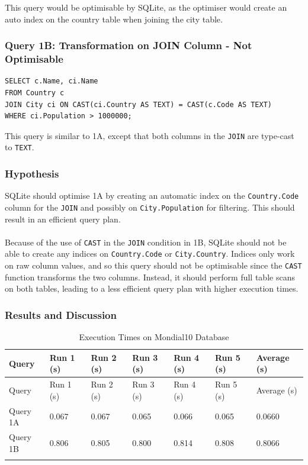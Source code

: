 \documentclass[11pt]{article}
\begin{document}
\noindent This query would be optimisable by SQLite, as the optimiser would create an auto index on the country table when joining the city table.

\subsubsection{Query 1B: Transformation on JOIN Column - Not Optimisable}

\begin{verbatim}
SELECT c.Name, ci.Name
FROM Country c
JOIN City ci ON CAST(ci.Country AS TEXT) = CAST(c.Code AS TEXT)
WHERE ci.Population > 1000000;
\end{verbatim}

\noindent This query is similar to 1A, except that both columns in the \texttt{JOIN} are type-cast to \texttt{TEXT}. 

\subsubsection{Hypothesis}

SQLite should optimise 1A by creating an automatic index on the \texttt{Country.Code} column for the \texttt{JOIN} and possibly
on \texttt{City.Population} for filtering. This should result in an efficient query plan.
\\ \\
Because of the use of \texttt{CAST} in the \texttt{JOIN} condition in 1B, SQLite should not be able to create any indices on
\texttt{Country.Code} or \texttt{City.Country}. Indices only work on raw column values, and so this query should not be optimisable since the
\texttt{CAST} function transforms the two columns. Instead, it should perform full table scans on both tables, leading to a less efficient
query plan with higher execution times.

\subsubsection{Results and Discussion}

\begin{longtable}{|l|l|l|l|l|l|l|}
\hline
Query & Run 1 (s) & Run 2 (s) & Run 3 (s) & Run 4 (s) & Run 5 (s) & Average (s) \\
\hline
\endfirsthead
\hline
Query & Run 1 (s) & Run 2 (s) & Run 3 (s) & Run 4 (s) & Run 5 (s) & Average (s) \\
\hline
\endhead
Query 1A & 0.067 & 0.067 & 0.065 & 0.066 & 0.065 & 0.0660 \\
Query 1B & 0.806 & 0.805 & 0.800 & 0.814 & 0.808 & 0.8066 \\
\hline
\caption{Execution Times on Mondial10 Database}
\end{longtable}
\end{document}
